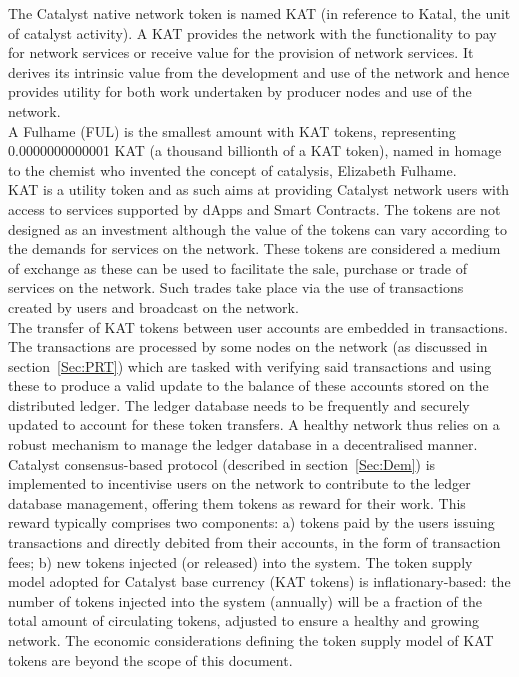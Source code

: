 The Catalyst native network token is named KAT (in reference to Katal, the unit of catalyst activity). A KAT provides the network with the functionality to pay for network services or receive value for the provision of network services. It derives its intrinsic value from the development and use of the network and hence provides utility for both work undertaken by producer nodes and use of the network. \\

A Fulhame (FUL) is the smallest amount with KAT tokens, representing 0.0000000000001 KAT (a thousand billionth of a KAT token), named in homage to the chemist who invented the concept of catalysis, Elizabeth Fulhame.\\

KAT is a utility token and as such aims at providing Catalyst network users with access to services supported by dApps and Smart Contracts. The tokens are not designed as an investment although the value of the tokens can vary according to the demands for services on the network. These tokens are considered a medium of exchange as these can be used to facilitate the sale, purchase or trade of services on the network. Such trades take place via the use of transactions created by users and broadcast on the network. \\

The transfer of KAT tokens between user accounts are embedded in transactions. The transactions are processed by some nodes on the network (as discussed in section~\ref{Sec:PRT}) which are tasked with verifying said transactions and using these to produce a valid update to the balance of these accounts stored on the distributed ledger. The ledger database needs to be frequently and securely updated to account for these token transfers. A healthy network thus relies on a robust mechanism to manage the ledger database in a decentralised manner. Catalyst consensus-based protocol (described in section~\ref{Sec:Dem}) is implemented to incentivise users on the network to contribute to the ledger database management, offering them tokens as reward for their work. This reward typically comprises two components: a) tokens paid by the users issuing transactions and directly debited from their accounts, in the form of transaction fees; b) new tokens injected (or released) into the system. The token supply model adopted for Catalyst base currency (KAT tokens) is inflationary-based: the number of tokens injected into the system (annually) will be a fraction of the total amount of circulating tokens, adjusted to ensure a healthy and growing network. The economic considerations defining the token supply model of KAT tokens are beyond the scope of this document. 
